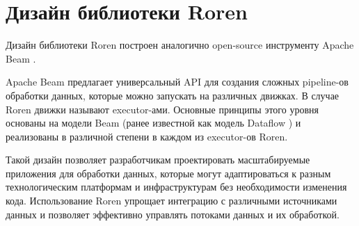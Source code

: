 \section{Дизайн библиотеки Roren}
\label{sec:design}

Дизайн библиотеки Roren построен аналогично open-source инструменту Apache Beam \cite{beam}.

Apache Beam предлагает универсальный API для создания сложных pipeline-ов обработки данных, которые можно запускать на различных движках. В случае Roren движки называют executor-ами. Основные принципы этого уровня основаны на модели Beam (ранее известной как модель Dataflow \cite{dataflow}) и реализованы в различной степени в каждом из executor-ов Roren.

Такой дизайн позволяет разработчикам проектировать масштабируемые приложения для обработки данных, которые могут адаптироваться к разным технологическим платформам и инфраструктурам без необходимости изменения кода. Использование Roren упрощает интеграцию с различными источниками данных и позволяет эффективно управлять потоками данных и их обработкой.

\newpage

\newpage

\newpage

